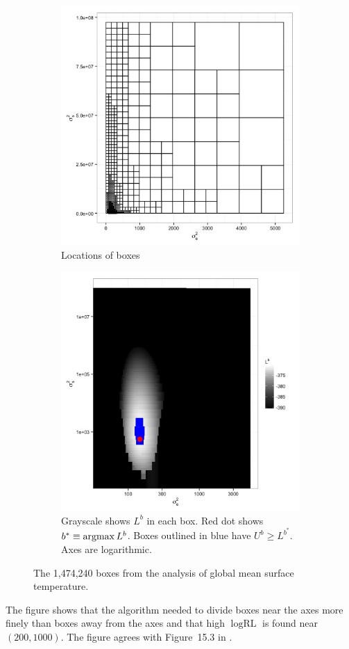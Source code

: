 \documentclass{report}
\newcommand{\RLorig}{\text{RL}}
\newcommand{\logRLorig}{\log\RLorig}
\newcommand{\argmax}{\operatornamewithlimits{argmax}}
\begin{document}
\begin{figure}
  \begin{subfigure}{.5\textwidth}
    \centering
    \includegraphics[width=.8\linewidth]{figs/gmst-boxes1.jpg}
    \caption{Locations of boxes}
    \label{fig:gmst-boxes1}
  \end{subfigure}
  \begin{subfigure}{.5\textwidth}
    \centering
    \includegraphics[width=.8\linewidth]{figs/gmst-rll1.jpg}
    \caption{Grayscale shows $L^b$ in each box.
                  Red dot shows $b^* \equiv\argmax L^b$.
	          Boxes outlined in blue have $U^b \ge L^{b^*}$.
	          Axes are logarithmic.}
    \label{fig:gmstrll1}
  \end{subfigure}
  \caption{The 1,474,240 boxes from the analysis of global mean surface temperature.}
\label{fig:gmst1}
\end{figure}
The figure shows that the algorithm needed to divide boxes near the axes more finely than boxes away from the axes and that high $\logRLorig$ is found near $(200, 1000)$.  The figure agrees with Figure~15.3 in \cite{hodges:2013}.
\end{document}
